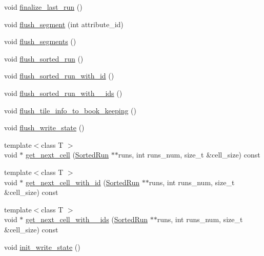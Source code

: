 \begin{DoxyCompactItemize}
\item 
void \hyperlink{classStorageManager_1_1Fragment_a1c6054177999ae03f64c403a98bcffb4}{finalize\+\_\+last\+\_\+run} ()
\item 
void \hyperlink{classStorageManager_1_1Fragment_a1a5a6c47e126e446c1360cd56200f6c8}{flush\+\_\+segment} (int attribute\+\_\+id)
\item 
void \hyperlink{classStorageManager_1_1Fragment_af24534aab0c30c3ad4e698f7b3616551}{flush\+\_\+segments} ()
\item 
void \hyperlink{classStorageManager_1_1Fragment_a041d59f0dbb25439d2d815fcb1ce5f8a}{flush\+\_\+sorted\+\_\+run} ()
\item 
void \hyperlink{classStorageManager_1_1Fragment_a71370dc250d104ac47923ef9cbafb9e2}{flush\+\_\+sorted\+\_\+run\+\_\+with\+\_\+id} ()
\item 
void \hyperlink{classStorageManager_1_1Fragment_afc7113f64fcab841248023faa67006b2}{flush\+\_\+sorted\+\_\+run\+\_\+with\+\_\+\_\+ids} ()
\item 
void \hyperlink{classStorageManager_1_1Fragment_aa59edd2ba1f571d176f3bd3edfaa25aa}{flush\+\_\+tile\+\_\+info\+\_\+to\+\_\+book\+\_\+keeping} ()
\item 
void \hyperlink{classStorageManager_1_1Fragment_af6174b7f9a3563b75171604ec699d365}{flush\+\_\+write\+\_\+state} ()
\item 
{\footnotesize template$<$class T $>$ }\\void $\ast$ \hyperlink{classStorageManager_1_1Fragment_a87ccd449a820cea6b30629ced081e597}{get\+\_\+next\+\_\+cell} (\hyperlink{classStorageManager_1_1SortedRun}{Sorted\+Run} $\ast$$\ast$runs, int runs\+\_\+num, size\+\_\+t \&cell\+\_\+size) const 
\item 
{\footnotesize template$<$class T $>$ }\\void $\ast$ \hyperlink{classStorageManager_1_1Fragment_afa066f5d08c4d147fd1061315aabc2be}{get\+\_\+next\+\_\+cell\+\_\+with\+\_\+id} (\hyperlink{classStorageManager_1_1SortedRun}{Sorted\+Run} $\ast$$\ast$runs, int runs\+\_\+num, size\+\_\+t \&cell\+\_\+size) const 
\item 
{\footnotesize template$<$class T $>$ }\\void $\ast$ \hyperlink{classStorageManager_1_1Fragment_a56b3756bb279e40a64e10813714ea254}{get\+\_\+next\+\_\+cell\+\_\+with\+\_\+\_\+ids} (\hyperlink{classStorageManager_1_1SortedRun}{Sorted\+Run} $\ast$$\ast$runs, int runs\+\_\+num, size\+\_\+t \&cell\+\_\+size) const 
\item 
void \hyperlink{classStorageManager_1_1Fragment_a73d50f4c7196b31fb28b1b2ce3647660}{init\+\_\+write\+\_\+state} ()
$$
\end{DoxyCompactItemize}
